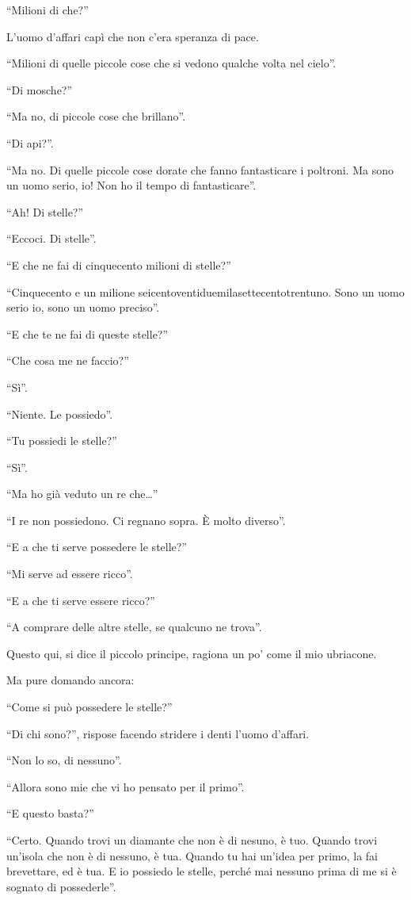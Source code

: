 \documentclass[11pt]{scrbook}
\begin{document}
``Milioni di che?''

L'uomo d'affari capì che non c'era speranza di pace.

``Milioni di quelle piccole cose che si vedono qualche volta nel cielo''.

``Di mosche?''

``Ma no, di piccole cose che brillano''.

``Di api?''.

``Ma no. Di quelle piccole cose dorate che fanno fantasticare i poltroni. Ma sono un uomo serio, io! Non ho il tempo di fantasticare''.

``Ah! Di stelle?''

``Eccoci. Di stelle''.

``E che ne fai di cinquecento milioni di stelle?''

``Cinquecento e un milione seicentoventiduemilasettecentotrentuno. Sono un uomo serio io, sono un uomo preciso''.

``E che te ne fai di queste stelle?''

``Che cosa me ne faccio?''

``Sì''.

``Niente. Le possiedo''.

``Tu possiedi le stelle?''

``Sì''.

``Ma ho già veduto un re che\ldots{}''

``I re non possiedono. Ci regnano sopra. È molto diverso''.

``E a che ti serve possedere le stelle?''

``Mi serve ad essere ricco''.

``E a che ti serve essere ricco?''

``A comprare delle altre stelle, se qualcuno ne trova''.

Questo qui, si dice il piccolo principe, ragiona un po' come il mio ubriacone.

Ma pure domando ancora:

``Come si può possedere le stelle?''

``Di chi sono?'', rispose facendo stridere i denti l'uomo d'affari.

``Non lo so, di nessuno''.

``Allora sono mie che vi ho pensato per il primo''.

``E questo basta?''

``Certo. Quando trovi un diamante che non è di nesuno, è tuo. Quando trovi un'isola che non è di nessuno, è tua. Quando tu hai un'idea per primo, la fai brevettare, ed è tua. E io possiedo le stelle, perché mai nessuno prima di me si è sognato di possederle''.
\end{document}
